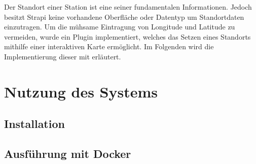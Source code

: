 Der Standort einer Station ist eine seiner fundamentalen Informationen. Jedoch
besitzt Strapi keine vorhandene Oberfläche oder Datentyp um Standortdaten
einzutragen. Um die mühsame Eintragung von Longitude und Latitude zu vermeiden,
wurde ein Plugin implementiert, welches das Setzen eines Standorts mithilfe
einer interaktiven Karte ermöglicht. Im Folgenden wird die Implementierung
dieser mit erläutert.

\section{Nutzung des Systems}

\subsection{Installation}

\subsection{Ausführung mit Docker}